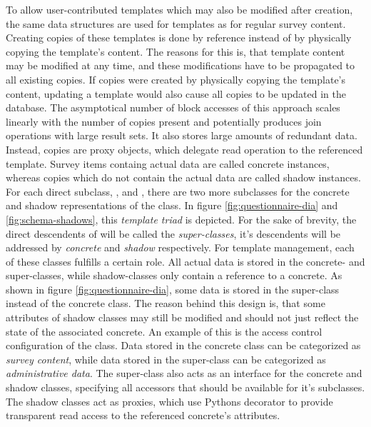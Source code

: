        To allow user-contributed templates which may also be modified after
        creation, the same data structures are used for templates as for
        regular survey content. Creating copies of these templates is done by
        reference instead of by physically copying the template's content.
        The reasons for this is, that template content may be modified
        at any time, and these modifications have to be propagated to
        all existing copies. If copies were created by physically
        copying the template's content, updating a template would
        also cause all copies to be updated in the database. The
        asymptotical number of block accesses of this approach scales linearly
        with the number of copies present and potentially produces
        join operations with large result sets. It also stores
        large amounts of redundant data. Instead, copies are
        proxy objects, which delegate read operation to the referenced
        template. Survey items containg actual data are called
        concrete instances, whereas copies which do not contain
        the actual data are called shadow instances.
        For each direct  subclass, , 
        and , there are two more subclasses for the concrete and shadow
        representations of the class. In figure \ref{fig:questionnaire-dia} and \ref{fig:schema-shadows},
        this \textit{template triad} is depicted. For the sake of brevity,
        the direct descendents of  will be called the \textit{super-classes},
        it's descendents will be addressed by \textit{concrete} and \textit{shadow}
        respectively. For template management,
        each of these classes fulfills a certain role. All actual data is stored
        in the concrete- and super-classes, while shadow-classes only
        contain a reference to a concrete. As shown in figure \ref{fig:questionnaire-dia},
        some data is stored in the super-class instead of the concrete class.
        The reason behind this design is, that some attributes of shadow classes
        may still be modified and should not just reflect the state of the associated
        concrete. An example of this is the access control configuration
        of the  class. Data stored in the concrete
        class can be categorized as \textit{survey content}, while data
        stored in the super-class can be categorized as \textit{administrative data}.
        The super-class also acts as an interface for the concrete and shadow classes,
        specifying all accessors that should be available for it's subclasses.
        The shadow classes act as proxies, which use Pythons 
        decorator to provide transparent read access to the referenced concrete's
        attributes.

